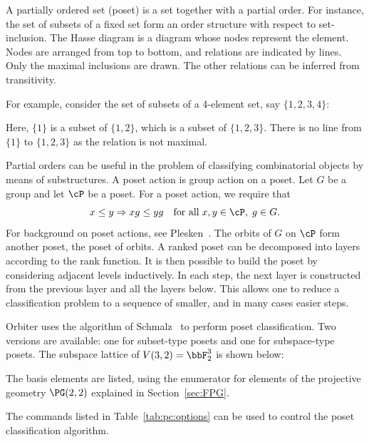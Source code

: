 
A partially ordered set (poset) is a set together with a partial order. 
For instance, the set of subsets of a fixed set form an order structure 
with respect to set-inclusion.
The Hasse diagram is a diagram whose nodes represent the element. 
Nodes are arranged from top to bottom, 
and relations are indicated by lines. 
Only the maximal inclusions are drawn. 
The other relations can be inferred from transitivity.

For example, consider the set of subsets of 
a 4-element set, say $\{1,2,3,4\}$:


Here, $\{1\}$ is a subset of $\{1,2\}$, which is a subset of $\{1,2,3\}$.
There is no line from $\{1\}$ to $\{1,2,3\}$ as the relation is not maximal. 


\bigskip


Partial orders can be useful in the problem of classifying combinatorial 
objects by means of substructures.
A poset action is group action on a poset. 
Let $G$ be a group and let $\cP$ be a poset. 
For a poset action, we require that 
$$
x \le y \Rightarrow xg \le yg \quad \mbox{for all} \; x,y \in \cP, \; g \in G.
$$
For background on poset actions, see Plesken~\cite{Plesken82}.
The orbits of $G$ on $\cP$ form another poset, the poset of orbits. 
A ranked poset can be decomposed into layers according to the rank function. 
It is then possible to build the poset by considering adjacent levels inductively.
In each step, the next layer is constructed from the previous layer and all the layers below.
This allows one to reduce a classification problem to a sequence of smaller, 
and in many cases easier steps.  


\bigskip




Orbiter uses the algorithm of Schmalz~\cite{Schmalz90} to perform poset classification.
Two versions are available: one for subset-type posets and one for subspace-type posets.
The subspace lattice of $V(3,2)=\bbF_2^3$ is shown below:


The basis elements are listed, using the enumerator for 
elements of the projective geometry $\PG(2,2)$ 
explained in Section~\ref{sec:FPG}.




\bigskip


The commands listed in Table~\ref{tab:pc:options}
can be used to control the poset classification algorithm.

